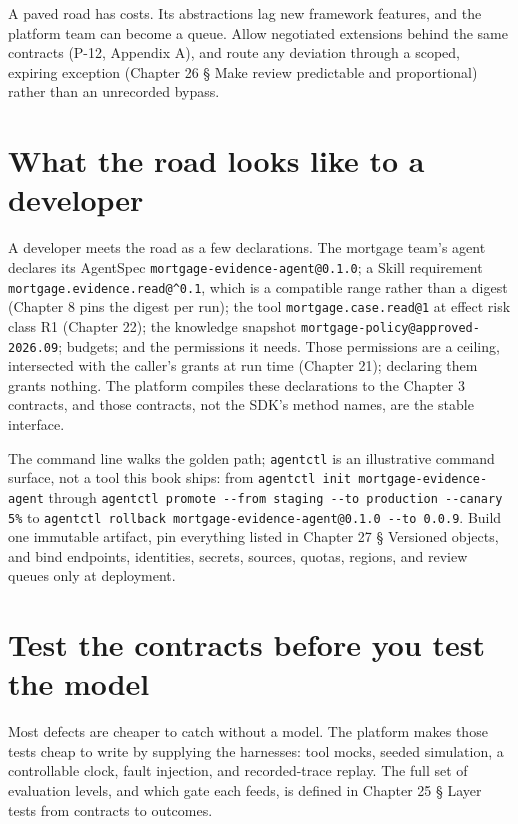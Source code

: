 A paved road has costs. Its abstractions lag new framework features, and the platform team can become a queue. Allow negotiated extensions behind the same contracts (P-12, Appendix A), and route any deviation through a scoped, expiring exception (Chapter 26 § Make review predictable and proportional) rather than an unrecorded bypass.\par

\section{What the road looks like to a developer}

A developer meets the road as a few declarations. The mortgage team's agent declares its AgentSpec \lstinline[style=bookinline]!mortgage-evidence-agent@0.1.0!; a Skill requirement \lstinline[style=bookinline]!mortgage.evidence.read@^0.1!, which is a compatible range rather than a digest (Chapter 8 pins the digest per run); the tool \lstinline[style=bookinline]!mortgage.case.read@1! at effect risk class R1 (Chapter 22); the knowledge snapshot \lstinline[style=bookinline]!mortgage-policy@approved-2026.09!; budgets; and the permissions it needs. Those permissions are a ceiling, intersected with the caller's grants at run time (Chapter 21); declaring them grants nothing. The platform compiles these declarations to the Chapter 3 contracts, and those contracts, not the SDK's method names, are the stable interface.\par

The command line walks the golden path; \lstinline[style=bookinline]!agentctl! is an illustrative command surface, not a tool this book ships: from \lstinline[style=bookinline]!agentctl init mortgage-evidence-agent! through \lstinline[style=bookinline]!agentctl promote --from staging --to production --canary 5%! to \lstinline[style=bookinline]!agentctl rollback mortgage-evidence-agent@0.1.0 --to 0.0.9!. Build one immutable artifact, pin everything listed in Chapter 27 § Versioned objects, and bind endpoints, identities, secrets, sources, quotas, regions, and review queues only at deployment.\par

\section{Test the contracts before you test the model}

Most defects are cheaper to catch without a model. The platform makes those tests cheap to write by supplying the harnesses: tool mocks, seeded simulation, a controllable clock, fault injection, and recorded-trace replay. The full set of evaluation levels, and which gate each feeds, is defined in Chapter 25 § Layer tests from contracts to outcomes.\par

